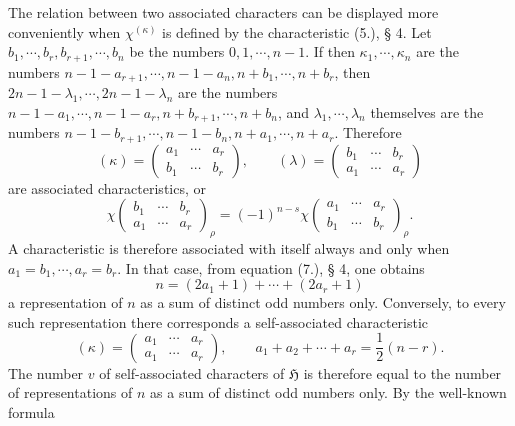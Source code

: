 \documentclass[11pt]{article}
\newcommand{\Hgr}{\mathfrak{H}}
\begin{document}
The relation between two associated characters can be displayed more conveniently when $\chi^{(\kappa)}$ is defined by the characteristic (5.), § 4. Let $b_1,
\cdots,b_r,b_{r+1},\cdots,b_n$ be the numbers $0,1,
\cdots,n-1$. If then $\kappa_1,
\cdots,
\kappa_n$ are the numbers $n-1-a_{r+1},
\cdots,n-1-a_n,n+b_1,
\cdots,n+b_r$, then $2n-1-
\lambda_1,
\cdots,2n-1-
\lambda_n$ are the numbers $n-1-a_1,
\cdots,n-1-a_r,n+b_{r+1},
\cdots,n+b_n$, and $\lambda_1,
\cdots,
\lambda_n$ themselves are the numbers $n-1-b_{r+1},
\cdots,n-1-b_n,n+a_1,
\cdots,n+a_r$. Therefore
\begin{equation}\tag{6.}
 (\kappa)=\left(\begin{matrix}a_1&\cdots&a_r\\ b_1&\cdots&b_r\end{matrix}\right),
 \qquad
 (\lambda)=\left(\begin{matrix}b_1&\cdots&b_r\\ a_1&\cdots&a_r\end{matrix}\right)
\end{equation}
are associated characteristics, or
\begin{equation}\tag{7.}
 \chi\left(\begin{matrix}b_1&\cdots&b_r\\ a_1&\cdots&a_r\end{matrix}\right)_\rho
 =(-1)^{n-s}\chi\left(\begin{matrix}a_1&\cdots&a_r\\ b_1&\cdots&b_r\end{matrix}\right)_\rho.
\end{equation}
A characteristic is therefore associated with itself always and only when $a_1=b_1,
\cdots,a_r=b_r$. In that case, from equation (7.), § 4, one obtains
\begin{equation}\tag{8.}
 n=(2a_1+1)+
\cdots+(2a_r+1)
\end{equation}
a representation of $n$ as a sum of distinct odd numbers only. Conversely, to every such representation there corresponds a self-associated characteristic
\begin{equation}\tag{9.}
 (\kappa)=\left(\begin{matrix}a_1&\cdots&a_r\\ a_1&\cdots&a_r\end{matrix}\right),
 \qquad
 a_1+a_2+
\cdots+a_r=\frac12(n-r).
\end{equation}
The number $v$ of self-associated characters of $\Hgr$ is therefore equal to the number of representations of $n$ as a sum of distinct odd numbers only. By the well-known formula
\end{document}
